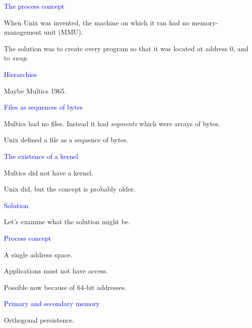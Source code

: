 \documentclass{slides}
\newcommand{\ti}[1]{\begin{center}\Large{\textcolor{blue}{#1}}\end{center}}
\begin{document}
\begin{slide}\ti{The process concept}

When Unix was invented, the machine on which it ran had no
memory-management unit (MMU).

The solution was to create every program so that it was located at
address 0, and to \emph{swap}.

\vfill\end{slide}
\begin{slide}\ti{Hierarchies}

Maybe Multics 1965.

\vfill\end{slide}
\begin{slide}\ti{Files as sequences of bytes}

Multics had no files.  Instead it had \emph{segments} which were
arrays of bytes.

Unix defined a file as a sequence of bytes.

\vfill\end{slide}
\begin{slide}\ti{The existence of a kernel}

Multics did not have a kernel.

Unix did, but the concept is probably older.

\vfill\end{slide}
\begin{slide}\ti{Solution}

Let's examine what the solution might be.

\vfill\end{slide}
\begin{slide}\ti{Process concept}

A single address space.

Applications must not have access.

Possible now because of 64-bit addresses.

\vfill\end{slide}
\begin{slide}\ti{Primary and secondary memory}

Orthogonal persistence.

\vfill\end{slide}
\end{document}
